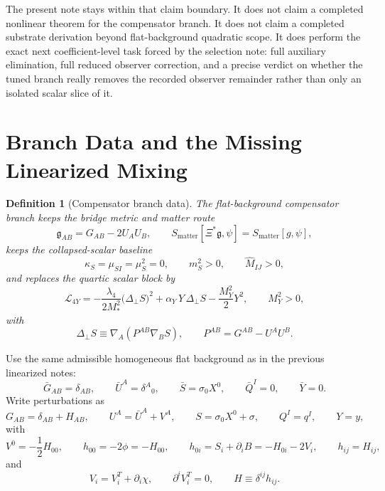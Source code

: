 \documentclass[11pt]{article}
\newcommand{\BridgeMetric}{\mathfrak{g}}
\newtheorem{definition}{Definition}
\begin{document}
The present note stays within that claim boundary. It does not claim a completed nonlinear theorem for the compensator branch. It does not claim a completed substrate derivation beyond flat-background quadratic scope. It does perform the exact next coefficient-level task forced by the selection note: full auxiliary elimination, full reduced observer correction, and a precise verdict on whether the tuned branch really removes the recorded observer remainder rather than only an isolated scalar slice of it.

\section{Branch Data and the Missing Linearized Mixing}

\begin{definition}[Compensator branch data]
\label{def:branch}
The flat-background compensator branch keeps the bridge metric and matter route
\begin{equation}
\BridgeMetric_{AB}=G_{AB}-2U_AU_B,
\qquad
S_{\mathrm{matter}}[\Xi^\ast\BridgeMetric,\psi]
=
S_{\mathrm{matter}}[g,\psi],
\label{eq:bridgeandmatter}
\end{equation}
keeps the collapsed-scalar baseline
\begin{equation}
\kappa_S=\mu_{SI}=\mu_S^2=0,
\qquad
m_S^2>0,
\qquad
\widehat M_{IJ}>0,
\label{eq:collapsed}
\end{equation}
and replaces the quartic scalar block by
\begin{equation}
\mathcal L_{4Y}
=
-\frac{\lambda_4}{2M_*^2}\bigl(\Delta_\perp S\bigr)^2
+\alpha_Y\,Y\,\Delta_\perp S
-\frac{M_Y^2}{2}Y^2,
\qquad
M_Y^2>0,
\label{eq:L4Y}
\end{equation}
with
\begin{equation}
\Delta_\perp S
\equiv
\nabla_A\!\left(P^{AB}\nabla_B S\right),
\qquad
P^{AB}=G^{AB}-U^AU^B.
\label{eq:Deltaperp}
\end{equation}
\end{definition}

Use the same admissible homogeneous flat background as in the previous linearized notes:
\begin{equation}
\bar G_{AB}=\delta_{AB},
\qquad
\bar U^A=\delta^A{}_0,
\qquad
\bar S=\sigma_0X^0,
\qquad
\bar Q^I=0,
\qquad
\bar Y=0.
\label{eq:background}
\end{equation}
Write perturbations as
\begin{equation}
G_{AB}=\delta_{AB}+H_{AB},
\qquad
U^A=\bar U^A+V^A,
\qquad
S=\sigma_0X^0+\sigma,
\qquad
Q^I=q^I,
\qquad
Y=y,
\label{eq:perturbations}
\end{equation}
with
\begin{equation}
V^0=-\frac{1}{2}H_{00},
\qquad
h_{00}=-2\phi=-H_{00},
\qquad
h_{0i}=S_i+\partial_iB=-H_{0i}-2V_i,
\qquad
h_{ij}=H_{ij},
\label{eq:metricpert}
\end{equation}
and
\begin{equation}
V_i=V_i^T+\partial_i\chi,
\qquad
\partial^iV_i^T=0,
\qquad
H\equiv \delta^{ij}h_{ij}.
\label{eq:Vdecomp}
\end{equation}
\end{document}
